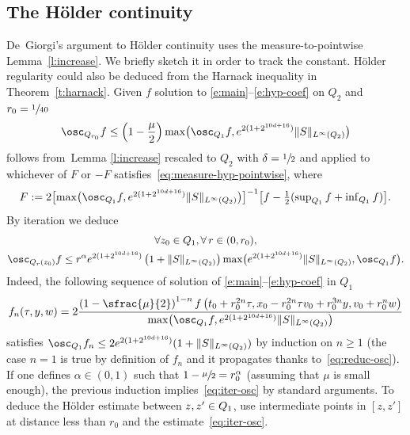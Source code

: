 \subsection{The Hölder continuity}
\label{ss:Holder}

De~Giorgi's argument to Hölder continuity uses the
measure-to-pointwise Lemma~\ref{l:increase}. We briefly sketch it
in order to track the constant. Hölder regularity could also be
deduced from the Harnack inequality in
Theorem~\ref{t:harnack}. Given $f$ solution to
\eqref{e:main}--\eqref{e:hyp-coef} on $Q_2$ and
$r_0 =\sfrac{1}{40}$
\begin{equation}
\label{eq:reduc-osc}
\osc_{Q_{r_0}}f \leq \left( 1- \frac{\mu}{2} \right)
\max\bigl(\osc_{Q_{1}}f,e^{2(1+2^{10d+16})} \|S\|_{L^{\infty}(Q_2)}\bigr)
\end{equation}
follows from~Lemma \ref{l:increase} rescaled to $Q_2$ with
$\delta=\sfrac12$ and applied to whichever of $F$ or $-F$
satisfies~\eqref{eq:measure-hyp-pointwise}, where
\[\textstyle
F : =2 \bigl[\max\bigl(\osc_{Q_{1}} f,
e^{2(1+2^{10d+16})}\|S\|_{L^{\infty}(Q_2)} \bigr) \bigr]^{-1} \bigl[f-\frac12
(\sup_{Q_{1}} f+\inf_{Q_{1}} f)\bigr].
\]
By iteration we deduce
\begin{multline}
\label{eq:iter-osc}
\forall z_0 \in Q_{1}, \forall \, r\in(0,r_0),\\
\osc_{Q_{r}(z_0)}f
\leq r^{\alpha} e^{2(1+2^{10d+16})}
\left(1+\|S\|_{L^{\infty}(Q_2)}\right) \max\bigl(e^{2(1+2^{10d+16})}
\|S\|_{L^{\infty}(Q_2)},\osc_{Q_1}f \bigr).
\end{multline}
Indeed, the following sequence of solution of
\eqref{e:main}--\eqref{e:hyp-coef} in $Q_1$
\begin{align*}
f_{n}(\tau,y,w)= 2
\frac{\left( 1 - \sfrac{\mu}{2}
\right)^{1-n} f\left(t_0+ r_0^{2n} \tau, x_0
-r_0^{2n} \tau v_0 + r_0^{3n} y,v_0+ r_0
^n w \right)}{\max \bigl(\osc_{Q_{1}}f, e^{2(1+2^{10d+16})}
\|S\|_{L^{\infty}(Q_2)} \bigr)}
\end{align*}
satisfies
$\osc_{Q_{1}}f_{n} \leq 2
e^{2(1+2^{10d+16})}(1+\|S\|_{L^{\infty}(Q_2)})$ by induction on
$n \!\ge\! 1$ (the case $n\!=\!1$ is true by definition of $f_n$ and it
propagates thanks to~\eqref{eq:reduc-osc}). If one defines
$\alpha\in (0,1)$ such that $1-\sfrac{\mu}{2}=r_0^{\alpha}$
(assuming that $\mu$ is small enough), the previous induction
implies~\eqref{eq:iter-osc} by standard arguments. To deduce the
Hölder estimate between $z,z'\in\nobreak Q_1$, use intermediate
points in $[z,z']$ at distance less than $r_0$ and the
estimate~\eqref{eq:iter-osc}.
